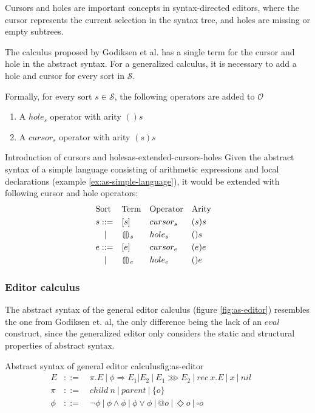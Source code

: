 \documentclass{article}
\newcommand{\cleftsemicirc}{\put(3.5,2.5){\oval(3,8)[l]}\put(4,-1.3){\line(0,1){8}}\phantom{\circ}}
\newcommand{\crightsemicirc}{\put(1.5,2.5){\oval(3,8)[r]}\put(1,-1.3){\line(0,1){8}}\phantom{\circ}}
\newcommand{\hole}{\cleftsemicirc \crightsemicirc}
\begin{document}
Cursors and holes are important concepts in syntax-directed editors, where the cursor represents the current selection in the syntax tree, and holes are missing or empty subtrees.

The calculus proposed by Godiksen et al.\cite{godiksen} has a single term for the cursor and hole in the abstract syntax. For a generalized calculus, it is necessary to add a hole and cursor for every sort in $\mathcal{S}$.

Formally, for every sort $s \in \mathcal{S}$, the following operators are added to $\mathcal{O}$

\begin{enumerate}
    \item A $hole_s$ operator with arity $()s$
    \item A $cursor_s$ operator with arity $(s)s$
\end{enumerate}

\begin{example}{Introduction of cursors and holes}{as-extended-cursors-holes}
Given the abstract syntax of a simple language consisting of arithmetic expressions and local declarations (example \ref{ex:as-simple-language}), it would be extended with following cursor and hole operators:
\[
\begin{aligned}
&\text{Sort} &        &\text{Term} &          &\text{Operator} &         &\text{Arity}           &&\\
&s ::=         & &[s]           & &cursor_s          & &(s)s         &&\\
&\quad |       & &\hole_s        & &hole_s          & &()s           &&\\
&e ::=         & &[e]           & &cursor_e          & &(e)e         &&\\
&\quad |       & &\hole_e        & &hole_e          & &()e
\end{aligned}
\]
\end{example}

\subsubsection{Editor calculus}
The abstract syntax of the general editor calculus (figure \ref{fig:as-editor}) resembles the one from Godiksen et. al, the only difference being the lack of an $eval$ construct, since the generalized editor only considers the static and structural properties of abstract syntax. 

\begin{myfigure}{Abstract syntax of general editor calculus}{fig:as-editor}
\[
\begin{aligned}
E &::= \quad \pi.E \ | \ \phi \Rightarrow E_1|E_2 \ | \ E_1 \ggg E_2 \ | \ rec \ x.E \ | \ x \ | \ nil &&\\
\pi &::= \quad child \ n \ | \ parent \ | \ \{ o \} &&\\
\phi &::= \quad \neg \phi \ | \ \phi \land \phi \ | \ \phi \lor \phi \ | \ @o \ | \ \Diamond o \ | \ \square o
\end{aligned}
\]
\end{myfigure}
\end{document}
